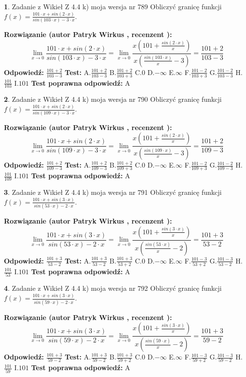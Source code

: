 \documentclass[12pt, a4paper]{article}
\theoremstyle{definition} %
\newtheorem{zad}{}
\newcommand{\zadStart}[1]{\begin{zad}#1\newline}
\newcommand{\zadStop}{\end{zad}}
\newcommand{\rozwStart}[2]{\noindent \textbf{Rozwiązanie (autor #1 , recenzent #2): }\newline}
\newcommand{\rozwStop}{\newline}
\newcommand{\odpStart}{\noindent \textbf{Odpowiedź:}\newline}
\newcommand{\odpStop}{\newline}
\newcommand{\testStart}{\noindent \textbf{Test:}\newline}
\newcommand{\testStop}{\newline}
\newcommand{\kluczStart}{\noindent \textbf{Test poprawna odpowiedź:}\newline}
\newcommand{\kluczStop}{\newline}
\begin{document}
\zadStart{Zadanie z Wikieł Z 4.4 k) moja wersja nr 789}
Obliczyć granicę funkcji $f(x)=\frac{101\cdot x +sin(2\cdot x)}{sin(103\cdot x) -3\cdot x}$.
\zadStop
\rozwStart{Patryk Wirkus}{}
$$\lim\limits_{x\to 0}\frac{101\cdot x +sin(2\cdot x)}{sin(103\cdot x) -3\cdot x}
=\lim\limits_{x\to 0}\frac{x(101+\frac{sin(2\cdot x)}{x})}{x(\frac{sin(103\cdot x)}{x}-3)}
=\frac{101+2}{103-3}$$
\rozwStop
\odpStart
$\frac{101+2}{103-3}$
\odpStop
\testStart
A.$\frac{101+2}{103-3}$
B.$\frac{101+2}{103+3}$
C.$0$
D.$-\infty$
E.$\infty$
F.$\frac{101-2}{103+3}$
G.$\frac{101-2}{103-3}$
H.$\frac{101}{103}$
I.$101$
\testStop
\kluczStart
A
\kluczStop



\zadStart{Zadanie z Wikieł Z 4.4 k) moja wersja nr 790}
Obliczyć granicę funkcji $f(x)=\frac{101\cdot x +sin(2\cdot x)}{sin(109\cdot x) -3\cdot x}$.
\zadStop
\rozwStart{Patryk Wirkus}{}
$$\lim\limits_{x\to 0}\frac{101\cdot x +sin(2\cdot x)}{sin(109\cdot x) -3\cdot x}
=\lim\limits_{x\to 0}\frac{x(101+\frac{sin(2\cdot x)}{x})}{x(\frac{sin(109\cdot x)}{x}-3)}
=\frac{101+2}{109-3}$$
\rozwStop
\odpStart
$\frac{101+2}{109-3}$
\odpStop
\testStart
A.$\frac{101+2}{109-3}$
B.$\frac{101+2}{109+3}$
C.$0$
D.$-\infty$
E.$\infty$
F.$\frac{101-2}{109+3}$
G.$\frac{101-2}{109-3}$
H.$\frac{101}{109}$
I.$101$
\testStop
\kluczStart
A
\kluczStop



\zadStart{Zadanie z Wikieł Z 4.4 k) moja wersja nr 791}
Obliczyć granicę funkcji $f(x)=\frac{101\cdot x +sin(3\cdot x)}{sin(53\cdot x) -2\cdot x}$.
\zadStop
\rozwStart{Patryk Wirkus}{}
$$\lim\limits_{x\to 0}\frac{101\cdot x +sin(3\cdot x)}{sin(53\cdot x) -2\cdot x}
=\lim\limits_{x\to 0}\frac{x(101+\frac{sin(3\cdot x)}{x})}{x(\frac{sin(53\cdot x)}{x}-2)}
=\frac{101+3}{53-2}$$
\rozwStop
\odpStart
$\frac{101+3}{53-2}$
\odpStop
\testStart
A.$\frac{101+3}{53-2}$
B.$\frac{101+3}{53+2}$
C.$0$
D.$-\infty$
E.$\infty$
F.$\frac{101-3}{53+2}$
G.$\frac{101-3}{53-2}$
H.$\frac{101}{53}$
I.$101$
\testStop
\kluczStart
A
\kluczStop



\zadStart{Zadanie z Wikieł Z 4.4 k) moja wersja nr 792}
Obliczyć granicę funkcji $f(x)=\frac{101\cdot x +sin(3\cdot x)}{sin(59\cdot x) -2\cdot x}$.
\zadStop
\rozwStart{Patryk Wirkus}{}
$$\lim\limits_{x\to 0}\frac{101\cdot x +sin(3\cdot x)}{sin(59\cdot x) -2\cdot x}
=\lim\limits_{x\to 0}\frac{x(101+\frac{sin(3\cdot x)}{x})}{x(\frac{sin(59\cdot x)}{x}-2)}
=\frac{101+3}{59-2}$$
\rozwStop
\odpStart
$\frac{101+3}{59-2}$
\odpStop
\testStart
A.$\frac{101+3}{59-2}$
B.$\frac{101+3}{59+2}$
C.$0$
D.$-\infty$
E.$\infty$
F.$\frac{101-3}{59+2}$
G.$\frac{101-3}{59-2}$
H.$\frac{101}{59}$
I.$101$
\testStop
\kluczStart
A
\kluczStop
\end{document}
